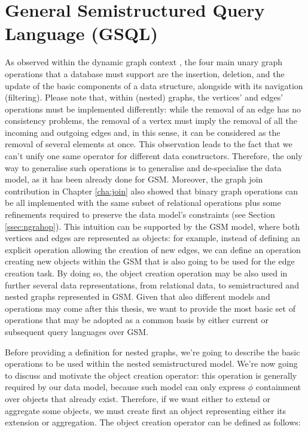 \section{General Semistructured Query Language (GSQL)}\label{sec:gsqldef}
As  observed within the dynamic graph context \cite{Demetrescu2010}, the four main unary graph operations that a database must support are the insertion,  deletion, and the update of the basic components of a data structure, alongside with its navigation (filtering). Please note that, within  (nested) graphs, the vertices' and edges' operations must be implemented differently: while the removal of an edge has no consistency problems, the removal of a vertex must imply the removal of all the incoming and outgoing edges and, in this sense, it can be considered as the removal of several elements at once. This observation leads to the fact that we can't unify one same operator for different data constructors. Therefore, the only way to generalise such operations is to generalise and de-specialise the data model, as it has been already done for GSM. Moreover, the graph join contribution in Chapter \ref{cha:join} also showed that binary graph operations can be all implemented with the same subset of relational operations plus some refinements required to preserve the data model's constraints (see Section \vref{ssec:ngrahop}). This intuition can be supported by the GSM model, where both vertices and edges are represented as objects: %
for example, instead of defining an explicit operation allowing the creation of new edges, we can  define an operation creating new objects within the GSM that is also going to be used for the edge creation task. By doing so, the object creation operation may be also used in further several data representations, from relational data, to semistructured and nested graphs  represented in GSM. Given that also different models and operations may come after this thesis, we want to provide the most basic set of operations that may be adopted  as a common basis by either current or subsequent query languages over GSM. 

Before providing a definition for nested graphs, we're going to describe the basic operations to be used within the nested semistructured model. We're now going to discuss and motivate the object creation operator: this operation is generally required by our data model, because such model can only express $\phi$ containment over objects that already exist. Therefore, if we want either to extend  or aggregate some objects, we must create first an object representing either its extension or  aggregation. The object creation operator can be defined as follows:

